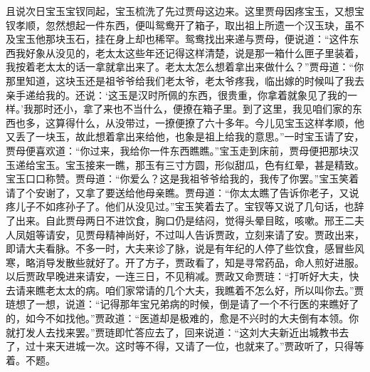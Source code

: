 \begin{parag}
    且说次日宝玉宝钗同起，宝玉梳洗了先过贾母这边来。这里贾母因疼宝玉，又想宝钗孝顺，忽然想起一件东西，便叫鸳鸯开了箱子，取出祖上所遗一个汉玉玦，虽不及宝玉他那块玉石，挂在身上却也稀罕。鸳鸯找出来递与贾母，便说道：“这件东西我好象从没见的，老太太这些年还记得这样清楚，说是那一箱什么匣子里装着，我按着老太太的话一拿就拿出来了。老太太怎么想着拿出来做什么？”贾母道：“你那里知道，这块玉还是祖爷爷给我们老太爷，老太爷疼我，临出嫁的时候叫了我去亲手递给我的。还说：‘这玉是汉时所佩的东西，很贵重，你拿着就象见了我的一样。’我那时还小，拿了来也不当什么，便撩在箱子里。到了这里，我见咱们家的东西也多，这算得什么，从没带过，一撩便撩了六十多年。今儿见宝玉这样孝顺，他又丢了一块玉，故此想着拿出来给他，也象是祖上给我的意思。”一时宝玉请了安，贾母便喜欢道：“你过来，我给你一件东西瞧瞧。”宝玉走到床前，贾母便把那块汉玉递给宝玉。宝玉接来一瞧，那玉有三寸方圆，形似甜瓜，色有红晕，甚是精致。宝玉口口称赞。贾母道：“你爱么？这是我祖爷爷给我的，我传了你罢。”宝玉笑着请了个安谢了，又拿了要送给他母亲瞧。贾母道：“你太太瞧了告诉你老子，又说疼儿子不如疼孙子了。他们从没见过。”宝玉笑着去了。宝钗等又说了几句话，也辞了出来。自此贾母两日不进饮食，胸口仍是结闷，觉得头晕目眩，咳嗽。邢王二夫人凤姐等请安，见贾母精神尚好，不过叫人告诉贾政，立刻来请了安。贾政出来，即请大夫看脉。不多一时，大夫来诊了脉，说是有年纪的人停了些饮食，感冒些风寒，略消导发散些就好了。开了方子，贾政看了，知是寻常药品，命人煎好进服。以后贾政早晚进来请安，一连三日，不见稍减。贾政又命贾琏：“打听好大夫，快去请来瞧老太太的病。咱们家常请的几个大夫，我瞧着不怎么好，所以叫你去。”贾琏想了一想，说道：“记得那年宝兄弟病的时候，倒是请了一个不行医的来瞧好了的，如今不如找他。”贾政道：“医道却是极难的，愈是不兴时的大夫倒有本领。你就打发人去找来罢。”贾琏即忙答应去了，回来说道：“这刘大夫新近出城教书去了，过十来天进城一次。这时等不得，又请了一位，也就来了。”贾政听了，只得等着。不题。
\end{parag}


